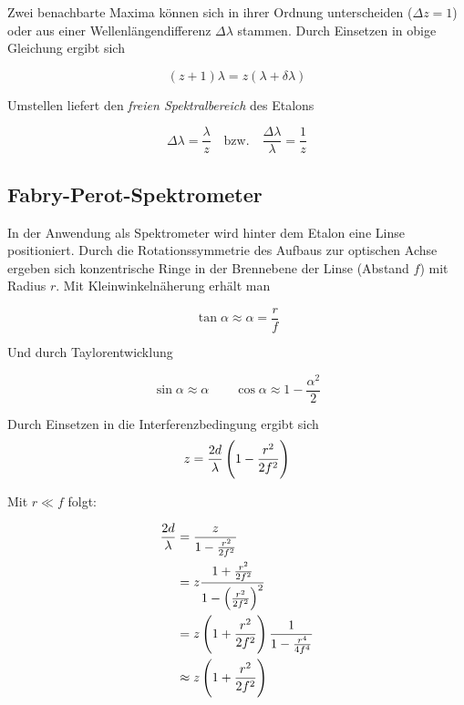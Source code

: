 \documentclass[a4paper,german,12pt,smallheadings]{scrartcl}
\begin{document}
Zwei benachbarte Maxima können sich in ihrer Ordnung unterscheiden ($\Delta z =
1$) oder aus einer Wellenlängendifferenz $\Delta \lambda$ stammen. Durch
Einsetzen in obige Gleichung ergibt sich

\begin{equation}
  (z+1) \lambda = z (\lambda + \delta \lambda)
\end{equation}

Umstellen liefert den \textit{freien Spektralbereich} des Etalons

\begin{equation}
  \Delta \lambda = \frac{\lambda}{z} \quad \text{bzw.} \quad \frac{\Delta \lambda}{\lambda} = \frac{1}{z}
\end{equation}

\subsection{Fabry-Perot-Spektrometer}

In der Anwendung als Spektrometer wird hinter dem Etalon eine Linse
positioniert. Durch die Rotationssymmetrie des Aufbaus zur optischen Achse
ergeben sich konzentrische Ringe in der Brennebene der Linse (Abstand $f$) mit
Radius $r$. Mit Kleinwinkelnäherung erhält man

\begin{equation}
  \tan \alpha \approx \alpha = \frac{r}{f}
\end{equation}

Und durch Taylorentwicklung

\begin{equation}
  \sin \alpha \approx \alpha \qquad \cos \alpha \approx 1 - \frac{\alpha^2}{2}
\end{equation}

Durch Einsetzen in die Interferenzbedingung ergibt sich
\begin{equation}
  z = \frac{2d}{\lambda} \del{1 - \frac{r^2}{2f^2}}
\end{equation}

Mit $r \ll f$ folgt:

\begin{align*}
  \frac{2d}{\lambda} &= \frac{z}{1-\frac{r^2}{2f^2}} \\
                     &= z \frac{1+\frac{r^2}{2f^2}}{1 - \del{\frac{r^2}{2f^2}}^2} \\
                     &= z \del{1 + \frac{r^2}{2f^2}} \frac{1}{1 - \frac{r^4}{4f^4}} \\
                     &\approx z \del{1+\frac{r^2}{2f^2}}
\end{align*}
\end{document}

